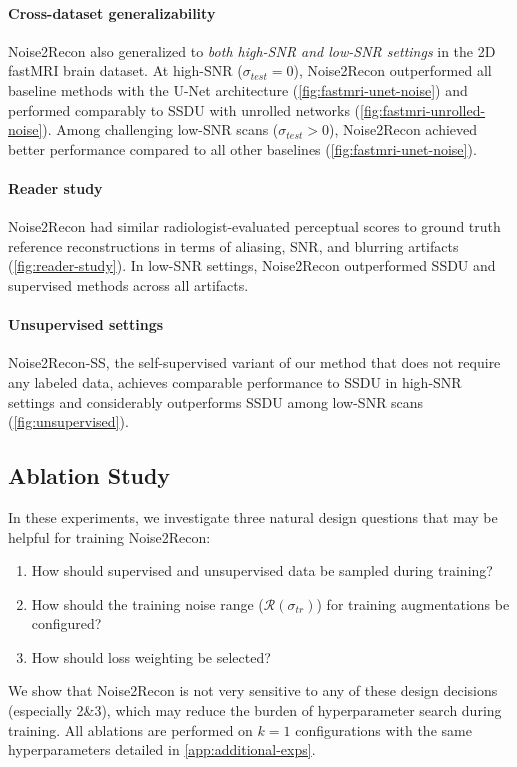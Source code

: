 \documentclass[10pt,twocolumn,letterpaper]{article}
\newcommand{\noiserange}{\mathcal{R}(\sigma_{tr})}
\newcommand{\RV}[1]{{#1}}
\begin{document}
\RV{
\paragraph{Cross-dataset generalizability} Noise2Recon also generalized to \textit{both high-SNR and low-SNR settings} in the 2D fastMRI brain dataset. At high-SNR ($\sigma_{test}=0$), Noise2Recon outperformed all baseline methods with the U-Net architecture (\cref{fig:fastmri-unet-noise}) and performed comparably to SSDU with unrolled networks (\cref{fig:fastmri-unrolled-noise}). Among challenging low-SNR scans ($\sigma_{test}>0$), Noise2Recon achieved better performance compared to all other baselines (\cref{fig:fastmri-unet-noise}).

\paragraph{Reader study} Noise2Recon had similar radiologist-evaluated perceptual scores to ground truth reference reconstructions in terms of aliasing, SNR, and blurring artifacts (\cref{fig:reader-study}). In low-SNR settings, Noise2Recon outperformed SSDU and supervised methods across all artifacts.


\paragraph{Unsupervised settings}  Noise2Recon-SS, the self-supervised variant of our method that does not require any labeled data, achieves comparable performance to SSDU in high-SNR settings and considerably outperforms SSDU among low-SNR scans (\cref{fig:unsupervised}).
}

\subsection{Ablation Study}
\label{sec:results-ablation}
In these experiments, we investigate three natural design questions that may be helpful for training Noise2Recon:
\begin{enumerate}
    \item How should supervised and unsupervised data be sampled during training?
    \item How should the training noise range ($\noiserange$) for training augmentations be configured?
    \item How should loss weighting be selected?
\end{enumerate}
We show that Noise2Recon is not very sensitive to any of these design decisions (especially 2\&3), which may reduce the burden of hyperparameter search during training. All ablations are performed on $k=1$ configurations with the same hyperparameters detailed in \cref{app:additional-exps}.
\end{document}
